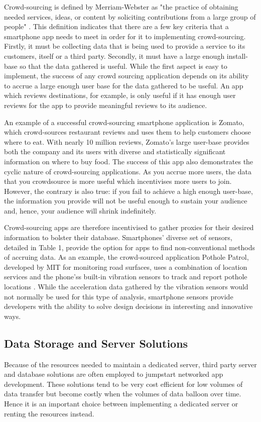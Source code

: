 Crowd-sourcing is defined by Merriam-Webster as "the practice of obtaining needed services, ideas, or content by soliciting contributions from a large group of people" \cite{Merriam-Webster}. This definition indicates that there are a few key criteria that a smartphone app needs to meet in order for it to implementing crowd-sourcing. Firstly, it must be collecting data that is being used to provide a service to its customers, itself or a third party. Secondly, it must have a large enough install-base so that the data gathered is useful. While the first aspect is easy to implement, the success of any crowd sourcing application depends on its ability to accrue a large enough user base for the data gathered to be useful. An app which reviews destinations, for example, is only useful if it has enough user reviews for the app to provide meaningful reviews to its audience. 

An example of a successful crowd-sourcing smartphone application is Zomato, which crowd-sources restaurant reviews and uses them to help customers choose where to eat. With nearly 10 million reviews, Zomato's large user-base provides both the company and its users with diverse and statistically significant information on where to buy food. The success of this app also demonstrates the cyclic nature of crowd-sourcing applications. As you accrue more users, the data that you crowdsource is more useful which incentivises more users to join. However, the contrary is also true: if you fail to achieve a high enough user-base, the information you provide will not be useful enough to sustain your audience and, hence, your audience will shrink indefinitely.

Crowd-sourcing apps are therefore incentivised to gather proxies for their desired information to bolster their database. Smartphones' diverse set of sensors, detailed in Table 1, provide the option for apps to find non-conventional methods of accruing data. As an example, the crowd-sourced application Pothole Patrol, developed by MIT for monitoring road surfaces, uses a combination of location services and the phone'ss built-in vibration sensors to track and report pothole locations \cite{eriksson2008pothole}. While the acceleration data gathered by the vibration sensors would not normally be used for this type of analysis, smartphone sensors provide developers with the ability to solve design decisions in interesting and innovative ways. 

\subsection{Data Storage and Server Solutions}
Because of the resources needed to maintain a dedicated server, third party server and database solutions are often employed to jumpstart networked app development. These solutions tend to be very cost efficient for low volumes of data transfer but become costly when the volumes of data balloon over time. Hence it is an important choice between implementing a dedicated server or renting the resources instead.

